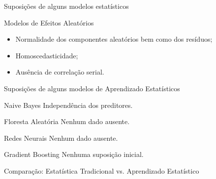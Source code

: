 \begin{frame}{Suposições de alguns modelos estatísticos}
	\begin{block}{Modelos de Efeitos Aleatórios}
		\begin{itemize}
			\item Normalidade dos componentes aleatórios bem como dos resíduos;
			\item Homoscedasticidade; 
			\item Ausência de correlação serial.
		\end{itemize}
	\end{block}
\end{frame}

\begin{frame}{Suposições de alguns modelos de Aprendizado Estatísticos}
	\begin{block}{Naive Bayes}
		Independência dos preditores.
	\end{block}
	\begin{block}{Floresta Aleatória}
		Nenhum dado ausente.
	\end{block}
	\begin{block}{Redes Neurais}
		Nenhum dado ausente.
	\end{block}
	\begin{block}{Gradient Boosting}
		Nenhuma suposição inicial.
	\end{block}
\end{frame}

\begin{frame}{Comparação: Estatística Tradicional vs. Aprendizado Estatístico}
\end{frame}


